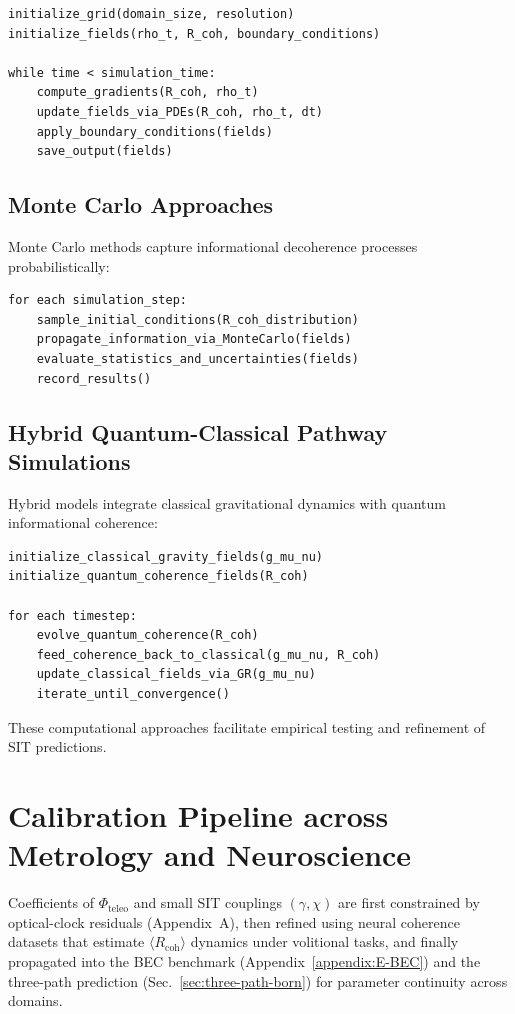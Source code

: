 \begin{verbatim}
initialize_grid(domain_size, resolution)
initialize_fields(rho_t, R_coh, boundary_conditions)

while time < simulation_time:
    compute_gradients(R_coh, rho_t)
    update_fields_via_PDEs(R_coh, rho_t, dt)
    apply_boundary_conditions(fields)
    save_output(fields)
\end{verbatim}

\subsection{Monte Carlo Approaches}

Monte Carlo methods capture informational decoherence processes probabilistically:

\begin{verbatim}
for each simulation_step:
    sample_initial_conditions(R_coh_distribution)
    propagate_information_via_MonteCarlo(fields)
    evaluate_statistics_and_uncertainties(fields)
    record_results()
\end{verbatim}

\subsection{Hybrid Quantum-Classical Pathway Simulations}

Hybrid models integrate classical gravitational dynamics with quantum informational coherence:

\begin{verbatim}
initialize_classical_gravity_fields(g_mu_nu)
initialize_quantum_coherence_fields(R_coh)

for each timestep:
    evolve_quantum_coherence(R_coh)
    feed_coherence_back_to_classical(g_mu_nu, R_coh)
    update_classical_fields_via_GR(g_mu_nu)
    iterate_until_convergence()
\end{verbatim}

These computational approaches facilitate empirical testing and refinement of SIT predictions.

\section{Calibration Pipeline across Metrology and Neuroscience}
\label{sec:calibration-pipeline}
Coefficients of $\Phi_{\mathrm{teleo}}$ and small SIT couplings $(\gamma,\chi)$ are first constrained by optical-clock residuals (Appendix~A), then refined using neural coherence datasets that estimate $\langle R_{\mathrm{coh}}\rangle$ dynamics under volitional tasks, and finally propagated into the BEC benchmark (Appendix~\ref{appendix:E-BEC}) and the three-path prediction (Sec.~\ref{sec:three-path-born}) for parameter continuity across domains.

